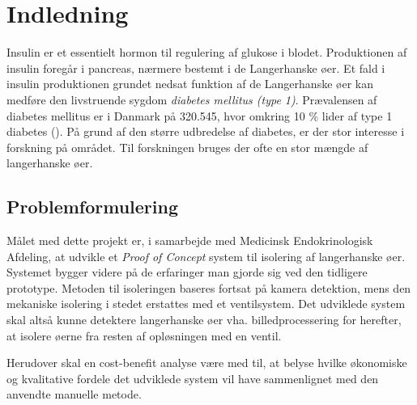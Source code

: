 \chapter{Indledning}
Insulin er et essentielt hormon til regulering af glukose i blodet. Produktionen af insulin foregår i pancreas, nærmere bestemt i de Langerhanske øer. Et fald i insulin produktionen grundet nedsat funktion af de Langerhanske øer kan medføre den livstruende sygdom \textit{diabetes mellitus (type 1)}. Prævalensen af diabetes mellitus er i Danmark på 320.545, hvor omkring 10 \% lider af type 1 diabetes (\cite{diabetes}). På grund af den større udbredelse af diabetes, er der stor interesse i forskning på området. Til forskningen bruges der ofte en stor mængde af langerhanske øer. 





\section{Problemformulering}

Målet med dette projekt er, i samarbejde med Medicinsk Endokrinologisk Afdeling, at udvikle et \textit{Proof of Concept} system til isolering af langerhanske øer. Systemet bygger videre på de erfaringer man gjorde sig ved den tidligere prototype. Metoden til isoleringen baseres fortsat på kamera detektion, mens den mekaniske isolering i stedet erstattes med et ventilsystem. Det udviklede system skal altså kunne detektere langerhanske øer vha. billedprocessering for herefter, at isolere øerne fra resten af opløsningen med en ventil. 

Herudover skal en cost-benefit analyse være med til, at belyse hvilke økonomiske og kvalitative fordele det udviklede system vil have sammenlignet med den anvendte manuelle metode.

